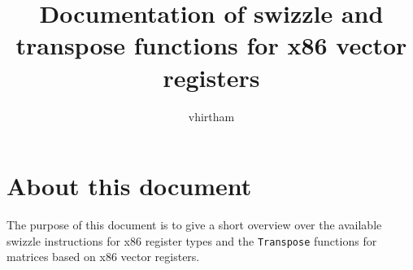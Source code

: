 \documentclass[]{scrartcl}
\title{Documentation of swizzle and transpose functions for x86 vector registers}
\author{vhirtham}
\begin{document}
		
\maketitle
\section*{About this document}
The purpose of this document is to give a short overview over the available swizzle instructions for x86 register types and the \texttt{Transpose} functions for matrices based on x86 vector registers.




\end{document}
